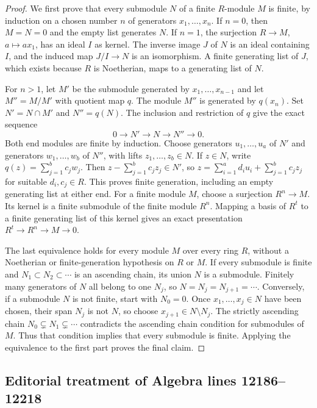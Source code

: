 \begin{proof}
We first prove that every submodule $N$ of a finite $R$-module
$M$ is finite, by induction on a chosen number $n$ of generators
$x_1,\ldots,x_n$. If $n=0$, then $M=N=0$ and the empty list
generates $N$. If $n=1$, the surjection $R\to M$, $a\mapsto ax_1$,
has an ideal $I$ as kernel. The inverse image $J$ of $N$ is an
ideal containing $I$, and the induced map $J/I\to N$ is an
isomorphism. A finite generating list of $J$, which exists because
$R$ is Noetherian, maps to a generating list of $N$.

For $n>1$, let $M'$ be the submodule generated by
$x_1,\ldots,x_{n-1}$ and let $M''=M/M'$ with quotient map $q$.
The module $M''$ is generated by $q(x_n)$.
Set $N'=N\cap M'$ and $N''=q(N)$. The inclusion and restriction
of $q$ give the exact sequence
$$
0\longrightarrow N'\longrightarrow N\longrightarrow N''
\longrightarrow0.
$$
Both end modules are finite by induction. Choose generators
$u_1,\ldots,u_a$ of $N'$ and generators
$w_1,\ldots,w_b$ of $N''$, with lifts
$z_1,\ldots,z_b\in N$. If $z\in N$, write
$q(z)=\sum_{j=1}^b c_jw_j$. Then
$z-\sum_{j=1}^b c_jz_j\in N'$, so
$z=\sum_{i=1}^a d_i u_i+\sum_{j=1}^b c_jz_j$ for suitable
$d_i,c_j\in R$. This proves finite generation, including an
empty generating list at either end.
For a finite module $M$, choose a surjection $R^n\to M$.
Its kernel is a finite submodule of the finite module $R^n$.
Mapping a basis of $R^t$ to a finite generating list of this
kernel gives an exact presentation $R^t\to R^n\to M\to0$.

The last equivalence holds for every module $M$ over every ring
$R$, without a Noetherian or finite-generation hypothesis on
$R$ or $M$. If every submodule is finite and
$N_1\subset N_2\subset\cdots$ is an ascending chain,
its union $N$ is a submodule. Finitely many generators of $N$
all belong to one $N_j$, so $N=N_j=N_{j+1}=\cdots$.
Conversely, if a submodule $N$ is not finite, start with
$N_0=0$. Once $x_1,\ldots,x_j\in N$ have been chosen, their
span $N_j$ is not $N$, so choose $x_{j+1}\in N\setminus N_j$.
The strictly ascending chain $N_0\subsetneq N_1\subsetneq\cdots$
contradicts the ascending chain condition for submodules of $M$.
Thus that condition implies that every submodule is finite.
Applying the equivalence to the first part proves the final claim.
\end{proof}


\subsection{Editorial treatment of Algebra lines 12186--12218}

